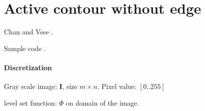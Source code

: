 \chapter{Active contour without edge}

Chan and Vese \cite{Chan2001}.

Sample code \cite{Getreuer2012}.

\subsubsection{Discretization}

Gray scale image: $\mathbf{I}$, size $m \times n$. Pixel value: $[0..255]$

level set function: $\Phi$ on domain of the image.